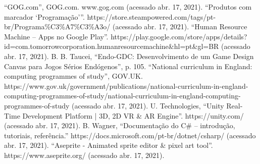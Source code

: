 \documentclass[conference]{IEEEtran}
\begin{document}
\begin{thebibliography}{23}
 ``GOG.com'', GOG.com. www.gog.com (acessado abr. 17, 2021).
 ``Produtos com marcador ‘Programação’''. https://store.steampowered.com/tags/pt-br/Programa\%C3\%A7\%C3\%A3o/ (acessado abr. 17, 2021).
 ``Human Resource Machine – Apps no Google Play''. https://play.google.com/store/apps/details?id=com.tomorrowcorporation.\linebreak humanresourcemachine\&hl=pt\&gl=BR (acessado abr. 17, 2021).
 B. B. Taucei, ``Endo-GDC: Desenvolvimento de um Game Design Canvas para Jogos Sérios Endógenos'', p. 105.
 ``National curriculum in England: computing programmes of study'', GOV.UK. https://www.gov.uk/government/publications/national-curriculum-in-england-computing-programmes-of-study/national-curriculum-in-england-computing-programmes-of-study (acessado abr. 17, 2021).
 U. Technologies, ``Unity Real-Time Development Platform | 3D, 2D VR \& AR Engine''. https://unity.com/ (acessado abr. 17, 2021).
 B. Wagner, ``Documentação do C\# – introdução, tutoriais, referência.'' https://docs.microsoft.com/pt-br/dotnet/csharp/ (acessado abr. 17, 2021).
 ``Aseprite - Animated sprite editor \& pixel art tool''. https://www.aseprite.org/ (acessado abr. 17, 2021).

\end{thebibliography}
\end{document}
